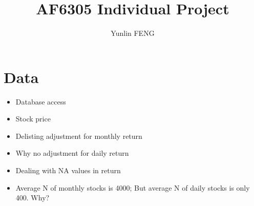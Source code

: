 \documentclass{article}
\author{Yunlin FENG}
\title{AF6305 Individual Project}
\begin{document}
\maketitle

\section{Data}

\begin{itemize}
  \item Database access
  \item Stock price
  \item Delisting adjustment for monthly return
  \item Why no adjustment for daily return
  \item Dealing with NA values in return
  \item Average N of monthly stocks is 4000; But average N of daily stocks is only 400. Why?
\end{itemize}




\end{document}
